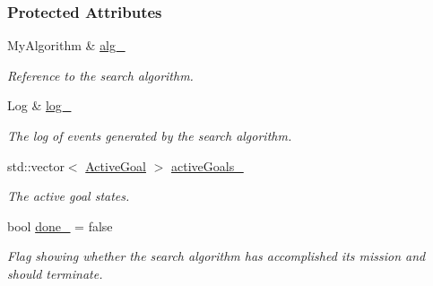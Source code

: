 \subsubsection*{Protected Attributes}
\begin{DoxyCompactItemize}
\item 
My\+Algorithm \& \hyperlink{structgoalHandler_1_1MultipleGoal_aa79a6b89cb73f9d8b8391cef953c2b36}{alg\+\_\+}\hypertarget{structgoalHandler_1_1MultipleGoal_aa79a6b89cb73f9d8b8391cef953c2b36}{}\label{structgoalHandler_1_1MultipleGoal_aa79a6b89cb73f9d8b8391cef953c2b36}

\begin{DoxyCompactList}\small\item\em Reference to the search algorithm. \end{DoxyCompactList}\item 
Log \& \hyperlink{structgoalHandler_1_1MultipleGoal_a107f9d5006fec8305d29f21abd294fc3}{log\+\_\+}\hypertarget{structgoalHandler_1_1MultipleGoal_a107f9d5006fec8305d29f21abd294fc3}{}\label{structgoalHandler_1_1MultipleGoal_a107f9d5006fec8305d29f21abd294fc3}

\begin{DoxyCompactList}\small\item\em The log of events generated by the search algorithm. \end{DoxyCompactList}\item 
std\+::vector$<$ \hyperlink{structgoalHandler_1_1MultipleGoal_a8fd8f62fd989f66b55abbed77c1d3bc9}{Active\+Goal} $>$ \hyperlink{structgoalHandler_1_1MultipleGoal_a8c52f09c2ef3b565088128bcd3e03c14}{active\+Goals\+\_\+}\hypertarget{structgoalHandler_1_1MultipleGoal_a8c52f09c2ef3b565088128bcd3e03c14}{}\label{structgoalHandler_1_1MultipleGoal_a8c52f09c2ef3b565088128bcd3e03c14}

\begin{DoxyCompactList}\small\item\em The active goal states. \end{DoxyCompactList}\item 
bool \hyperlink{structgoalHandler_1_1MultipleGoal_acdd068fedfb89c2f283f63bac0d57df1}{done\+\_\+} = false\hypertarget{structgoalHandler_1_1MultipleGoal_acdd068fedfb89c2f283f63bac0d57df1}{}\label{structgoalHandler_1_1MultipleGoal_acdd068fedfb89c2f283f63bac0d57df1}

\begin{DoxyCompactList}\small\item\em Flag showing whether the search algorithm has accomplished its mission and should terminate. \end{DoxyCompactList}\end{DoxyCompactItemize}


